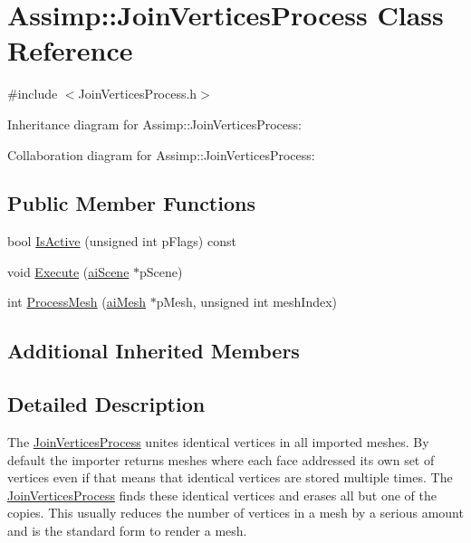 \hypertarget{class_assimp_1_1_join_vertices_process}{\section{Assimp\+:\+:Join\+Vertices\+Process Class Reference}
\label{class_assimp_1_1_join_vertices_process}
}


{\ttfamily \#include $<$Join\+Vertices\+Process.\+h$>$}



Inheritance diagram for Assimp\+:\+:Join\+Vertices\+Process\+:


Collaboration diagram for Assimp\+:\+:Join\+Vertices\+Process\+:
\subsection*{Public Member Functions}
\begin{DoxyCompactItemize}
\item 
bool \hyperlink{class_assimp_1_1_join_vertices_process_a8917ac3b245e9ff39502bbfcb5365543}{Is\+Active} (unsigned int p\+Flags) const 
\item 
void \hyperlink{class_assimp_1_1_join_vertices_process_a8930ce25e09083b42e34c6e0d87b7453}{Execute} (\hyperlink{structai_scene}{ai\+Scene} $\ast$p\+Scene)
\item 
int \hyperlink{class_assimp_1_1_join_vertices_process_ab900e951f4144ee6754c9176cb3ba36e}{Process\+Mesh} (\hyperlink{structai_mesh}{ai\+Mesh} $\ast$p\+Mesh, unsigned int mesh\+Index)
\end{DoxyCompactItemize}
\subsection*{Additional Inherited Members}


\subsection{Detailed Description}
The \hyperlink{class_assimp_1_1_join_vertices_process}{Join\+Vertices\+Process} unites identical vertices in all imported meshes. By default the importer returns meshes where each face addressed its own set of vertices even if that means that identical vertices are stored multiple times. The \hyperlink{class_assimp_1_1_join_vertices_process}{Join\+Vertices\+Process} finds these identical vertices and erases all but one of the copies. This usually reduces the number of vertices in a mesh by a serious amount and is the standard form to render a mesh. 


